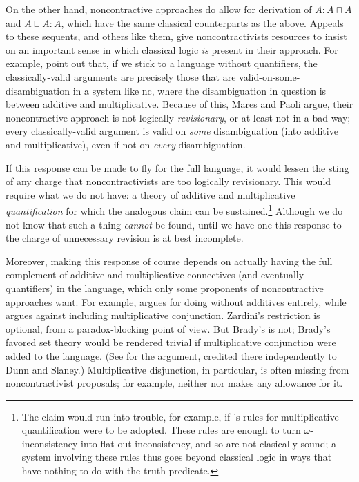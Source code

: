 \documentclass{ergoclass}
\newcommand{\sqq}[2]{\ensuremath{#1  \mathrel{:}  #2}}
\newcommand{\aor}{\ensuremath{\sqcup}}
\newcommand{\aand}{\ensuremath{\sqcap}}
\newcommand{\nclog}{{\sc nc}}
\renewcommand{\cite}{\citet}						%
\begin{document}
On the other hand, noncontractive approaches do allow for derivation of $\sqq{A}{A \aand A}$ and $\sqq{A \aor A}{A}$, which have the same classical counterparts as the above. Appeals to these sequents, and others like them, give noncontractivists resources to insist on an important sense in which classical logic {\em is} present in their approach. For example, \cite{mp:lcp} point out that, if we stick to a language without quantifiers, the classically-valid arguments are precisely those that are valid-on-some-disambiguation in a system like \nclog, where the disambiguation in question is between additive and multiplicative. Because of this, Mares and Paoli argue, their noncontractive approach is not logically {\em revisionary}, or at least not in a bad way; every classically-valid argument is valid on {\em some} disambiguation (into additive and multiplicative), even if not on {\em every} disambiguation.

If this response can be made to fly for the full language, it would lessen the sting of any charge that noncontractivists are too logically revisionary. This would require what we do not have: a theory of additive and multiplicative {\em quantification} for which the analogous claim can be sustained.\footnote{The claim would run into trouble, for example, if \citeauthor{zardini:twc}'s \citeyearpar{zardini:twc} rules for multiplicative quantification were to be adopted. These rules are enough to turn $\omega$-inconsistency into flat-out inconsistency, and so are not clasically sound; a system involving these rules thus goes beyond classical logic in ways that have nothing to do with the truth predicate.} Although we do not know that such a thing {\em cannot} be found, until we have one this response to the charge of unnecessary revision is at best incomplete.

Moreover, making this response of course depends on actually having the full complement of additive and multiplicative connectives (and eventually quantifiers) in the language, which only some proponents of noncontractive approaches want. For example, \cite{zardini:nmp} argues for doing without additives entirely, while \cite[34--35]{brady:ul} argues against including multiplicative conjunction. Zardini's restriction is optional, from a paradox-blocking point of view. But Brady's is not; Brady's favored set theory would be rendered trivial if multiplicative conjunction were added to the language. (See \citealt[366-367]{rlr1} for the argument, credited there independently to Dunn and Slaney.) Multiplicative disjunction, in particular, is often missing from noncontractivist proposals; for example, neither \cite{shapiro:nscp} nor \cite{bm:2curry} makes any allowance for it.
\end{document}
